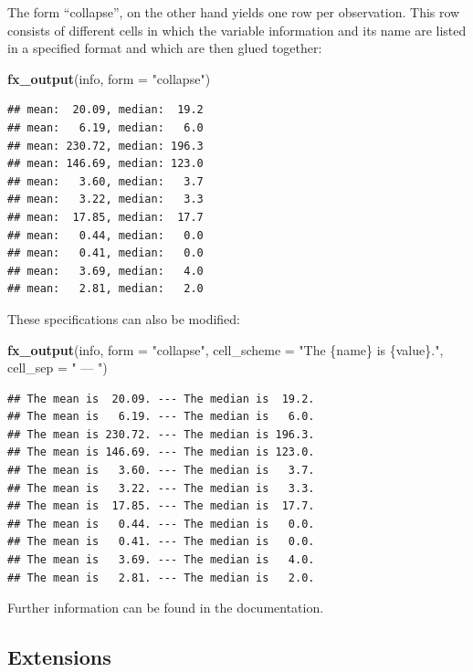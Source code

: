 \documentclass[]{report}
\newenvironment{Shaded}{\begin{snugshade}}{\end{snugshade}}
\newcommand{\KeywordTok}[1]{\textcolor[rgb]{0.13,0.29,0.53}{\textbf{#1}}}
\newcommand{\DataTypeTok}[1]{\textcolor[rgb]{0.13,0.29,0.53}{#1}}
\newcommand{\StringTok}[1]{\textcolor[rgb]{0.31,0.60,0.02}{#1}}
\newcommand{\NormalTok}[1]{#1}
\theoremstyle{definition}
\theoremstyle{definition}
\theoremstyle{definition}
\theoremstyle{remark}
\begin{document}
The form ``collapse'', on the other hand yields one row per observation.
This row consists of different cells in which the variable information
and its name are listed in a specified format and which are then glued
together:

\begin{Shaded}
\begin{Highlighting}[]
\KeywordTok{fx_output}\NormalTok{(info, }\DataTypeTok{form =} \StringTok{"collapse"}\NormalTok{)}
\end{Highlighting}
\end{Shaded}

\begin{verbatim}
## mean:  20.09, median:  19.2
## mean:   6.19, median:   6.0
## mean: 230.72, median: 196.3
## mean: 146.69, median: 123.0
## mean:   3.60, median:   3.7
## mean:   3.22, median:   3.3
## mean:  17.85, median:  17.7
## mean:   0.44, median:   0.0
## mean:   0.41, median:   0.0
## mean:   3.69, median:   4.0
## mean:   2.81, median:   2.0
\end{verbatim}

These specifications can also be modified:

\begin{Shaded}
\begin{Highlighting}[]
\KeywordTok{fx_output}\NormalTok{(info, }\DataTypeTok{form =} \StringTok{"collapse"}\NormalTok{, }\DataTypeTok{cell_scheme =} \StringTok{"The \{name\} is \{value\}."}\NormalTok{, }\DataTypeTok{cell_sep =} \StringTok{" --- "}\NormalTok{)}
\end{Highlighting}
\end{Shaded}

\begin{verbatim}
## The mean is  20.09. --- The median is  19.2.
## The mean is   6.19. --- The median is   6.0.
## The mean is 230.72. --- The median is 196.3.
## The mean is 146.69. --- The median is 123.0.
## The mean is   3.60. --- The median is   3.7.
## The mean is   3.22. --- The median is   3.3.
## The mean is  17.85. --- The median is  17.7.
## The mean is   0.44. --- The median is   0.0.
## The mean is   0.41. --- The median is   0.0.
## The mean is   3.69. --- The median is   4.0.
## The mean is   2.81. --- The median is   2.0.
\end{verbatim}

Further information can be found in the documentation.

\subsection{Extensions}\label{extensions-2}
\end{document}
